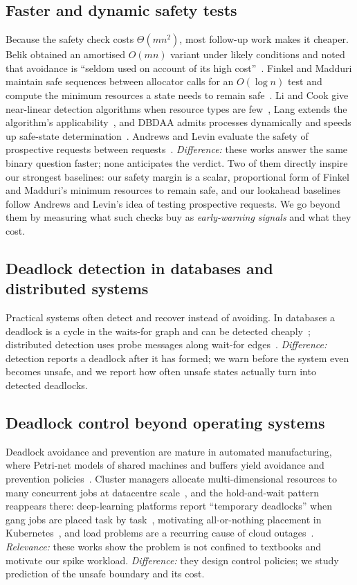 \documentclass[conference]{IEEEtran}
\begin{document}
\subsection{Faster and dynamic safety tests}
Because the safety check costs $\Theta(mn^2)$, most follow-up work makes it cheaper. Belik obtained an amortised $O(mn)$ variant under likely conditions and noted that avoidance is ``seldom used on account of its high cost''~\cite{Belik1987}. Finkel and Madduri maintain safe sequences between allocator calls for an $O(\log n)$ test and compute the minimum resources a state needs to remain safe~\cite{Finkel1987}. Li and Cook give near-linear detection algorithms when resource types are few~\cite{LiCook2007}, Lang extends the algorithm's applicability~\cite{Lang1999}, and DBDAA admits processes dynamically and speeds up safe-state determination~\cite{Zohora2024}. Andrews and Levin evaluate the safety of prospective requests between requests~\cite{AndrewsLevin1982}. \emph{Difference:} these works answer the same binary question faster; none anticipates the verdict. Two of them directly inspire our strongest baselines: our safety margin is a scalar, proportional form of Finkel and Madduri's minimum resources to remain safe, and our lookahead baselines follow Andrews and Levin's idea of testing prospective requests. We go beyond them by measuring what such checks buy as \emph{early-warning signals} and what they cost.

\subsection{Deadlock detection in databases and distributed systems}
Practical systems often detect and recover instead of avoiding. In databases a deadlock is a cycle in the waits-for graph and can be detected cheaply~\cite{Agrawal1983,Knapp1987}; distributed detection uses probe messages along wait-for edges~\cite{Chandy1983,Singhal1989}. \emph{Difference:} detection reports a deadlock after it has formed; we warn before the system even becomes unsafe, and we report how often unsafe states actually turn into detected deadlocks.

\subsection{Deadlock control beyond operating systems}
Deadlock avoidance and prevention are mature in automated manufacturing, where Petri-net models of shared machines and buffers yield avoidance and prevention policies~\cite{Banaszak1990,Ezpeleta1995,Fanti2004,Li2008}. Cluster managers allocate multi-dimensional resources to many concurrent jobs at datacentre scale~\cite{Verma2015}, and the hold-and-wait pattern reappears there: deep-learning platforms report ``temporary deadlocks'' when gang jobs are placed task by task~\cite{Jayaram2019FfDL,Lin2019DRAGON}, motivating all-or-nothing placement in Kubernetes~\cite{K8sBlog2025}, and load problems are a recurring cause of cloud outages~\cite{Gunawi2016}. \emph{Relevance:} these works show the problem is not confined to textbooks and motivate our spike workload. \emph{Difference:} they design control policies; we study prediction of the unsafe boundary and its cost.
\end{document}
